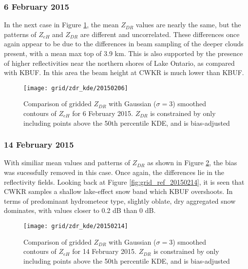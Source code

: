\subsubsection{6 February 2015}
In the next case in Figure \ref{fig:grid_zdr_kde_20150206}, the mean $Z_{DR}$ values are nearly the same, but the patterns of $Z_{eH}$ and $Z_{DR}$ are different and uncorrelated. These differences once again appear to be due to the differences in beam sampling of the deeper clouds present, with a mean max top of 3.9 km. This is also supported by the presence of higher reflectivities near the northern shores of Lake Ontario, as compared with KBUF. In this area the beam height at CWKR is much lower than KBUF.
\begin{figure}[H]
\texttt{[image: grid/zdr\_kde/20150206]}
\caption{Comparison of gridded $Z_{DR}$ with Gaussian ($\sigma=3$) smoothed contours of $Z_{eH}$ for 6 February 2015. $Z_{DR}$ is constrained by only including points above the 50th percentile KDE, and is bias-adjusted} 
\label{fig:grid_zdr_kde_20150206}
\end{figure}

\subsubsection{14 February 2015}
With similiar mean values and patterns of $Z_{DR}$ as shown in Figure \ref{fig:grid_zdr_kde_20150214}, the bias was sucessfully removed in this case. Once again, the differences lie in the reflectivity fields. Looking back at Figure \ref{fig:grid_ref_20150214}, it is seen that CWKR samples a shallow lake-effect snow band which KBUF overshoots. In terms of predominant hydrometeor type, slightly oblate, dry aggregated snow dominates, with values closer to 0.2 dB than 0 dB. 
\begin{figure}[H]
\texttt{[image: grid/zdr\_kde/20150214]}
\caption{Comparison of gridded $Z_{DR}$ with Gaussian ($\sigma=3$) smoothed contours of $Z_{eH}$ for 14 February 2015. $Z_{DR}$ is constrained by only including points above the 50th percentile KDE, and is bias-adjusted} 
\label{fig:grid_zdr_kde_20150214}
\end{figure}

